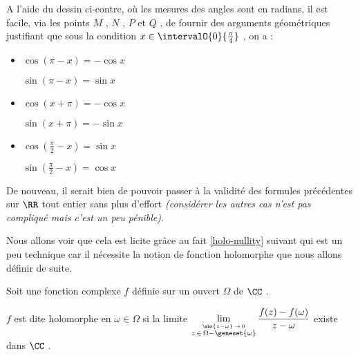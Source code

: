 \begin{wrapfigure}{r}{0.525\textwidth} 
	\vspace{-.75em}
	\begin{center}
	\end{center}
	\vspace{-3em}
\end{wrapfigure} 


A l'aide du dessin ci-contre, où les mesures des angles sont en radians, il est facile, via les points $M$ , $N$ , $P$ et $Q$ , de fournir des arguments géométriques justifiant que sous la condition $x\in \intervalO{0}{\frac{\pi}{4}}$ , on a :

\begin{itemize}[label=\small\textbullet]
	\item $\cos (\pi - x) = - \cos x$

	      \noindent
	      $\sin (\pi - x) = \sin x$ 

	\smallskip
	\item $\cos (x + \pi) = - \cos x$

	      \noindent
	      $\sin (x + \pi) = - \sin x$

	\smallskip
	\item $\cos \left( \frac{\pi}{2} - x \right) = \sin x$

	      \noindent
	      $\sin \left( \frac{\pi}{2} - x \right) = \cos x$ 
\end{itemize}


De nouveau, il serait bien de pouvoir passer à la validité des formules précédentes sur $\RR$ tout entier sans plus d'effort \emph{(considérer les autres cas n'est pas compliqué mais c'est un peu pénible)}.


\medskip

Nous allons voir que cela est licite grâce au fait \ref{holo-nullity} suivant qui est un peu technique car il nécessite la notion de fonction holomorphe que nous allons définir de suite.


\medskip

\begin{definition*}
	Soit une fonction complexe $f$ définie sur un ouvert $\Omega$ de $\CC$ .
	
	\smallskip
	
	$f$ est dite holomorphe en $\omega \in \Omega$ si la limite $\displaystyle \lim_{\stackrel{\abs{z - \omega} \, \rightarrow \, 0}{z \, \in \, \Omega - \geneset{\omega}}} \frac{f(z) - f(\omega)}{z - \omega}$ existe dans $\CC$ .
\end{definition*}


